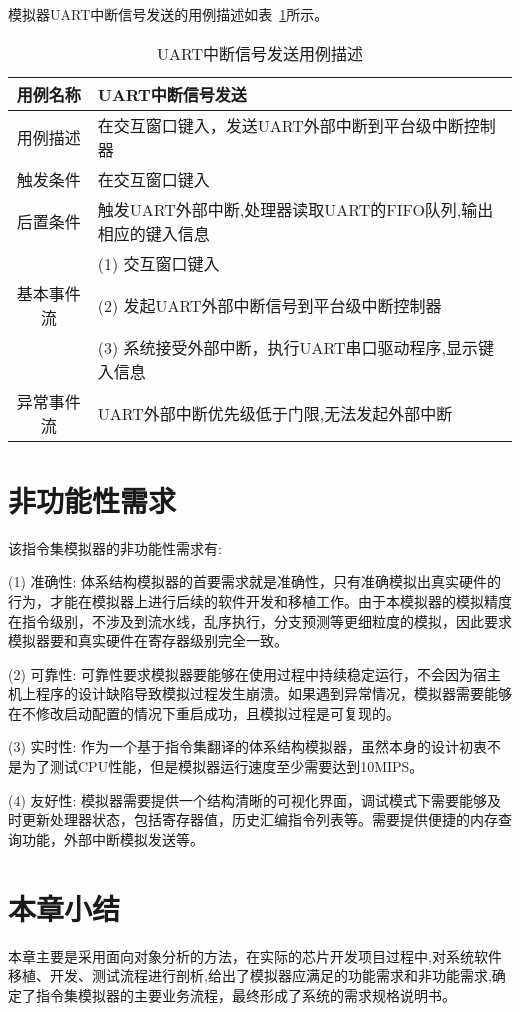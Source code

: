 模拟器UART中断信号发送的用例描述如表~\ref{tab:yongli5}所示。
\begin{table}[H]
  \centering
  \caption{UART中断信号发送用例描述}
  \label{tab:yongli5}
  \renewcommand\arraystretch{1.1}
  \begin{tabular}{cl}
    \toprule
用例名称 & UART中断信号发送\\
    \midrule
用例描述	& \multicolumn{1}{p{9cm}}{在交互窗口键入，发送UART外部中断到平台级中断控制器}\\ \hline
触发条件	& \multicolumn{1}{p{9cm}}{在交互窗口键入}\\ \hline
后置条件	& \multicolumn{1}{p{9cm}}{触发UART外部中断,处理器读取UART的FIFO队列,输出相应的键入信息}\\ \hline
 &	\multicolumn{1}{p{9cm}}{(1)	交互窗口键入}\\
 基本事件流 & \multicolumn{1}{p{9cm}}{(2)	发起UART外部中断信号到平台级中断控制器}\\
 & \multicolumn{1}{p{9cm}}{(3)	系统接受外部中断，执行UART串口驱动程序,显示键入信息}\\ \hline
异常事件流 &	\multicolumn{1}{p{9cm}}{UART外部中断优先级低于门限,无法发起外部中断}\\
    \bottomrule
  \end{tabular}
\end{table}


\section{非功能性需求}

该指令集模拟器的非功能性需求有:


(1) 准确性: 体系结构模拟器的首要需求就是准确性，只有准确模拟出真实硬件的行为，才能在模拟器上进行后续的软件开发和移植工作。由于本模拟器的模拟精度在指令级别，不涉及到流水线，乱序执行，分支预测等更细粒度的模拟，因此要求模拟器要和真实硬件在寄存器级别完全一致。


(2) 可靠性: 可靠性要求模拟器要能够在使用过程中持续稳定运行，不会因为宿主机上程序的设计缺陷导致模拟过程发生崩溃。如果遇到异常情况，模拟器需要能够在不修改启动配置的情况下重启成功，且模拟过程是可复现的。


(3) 实时性: 作为一个基于指令集翻译的体系结构模拟器，虽然本身的设计初衷不是为了测试CPU性能，但是模拟器运行速度至少需要达到10MIPS。


(4) 友好性: 模拟器需要提供一个结构清晰的可视化界面，调试模式下需要能够及时更新处理器状态，包括寄存器值，历史汇编指令列表等。需要提供便捷的内存查询功能，外部中断模拟发送等。




\section{本章小结}

本章主要是采用面向对象分析的方法，在实际的芯片开发项目过程中,对系统软件移植、开发、测试流程进行剖析,给出了模拟器应满足的功能需求和非功能需求,确定了指令集模拟器的主要业务流程，最终形成了系统的需求规格说明书。



